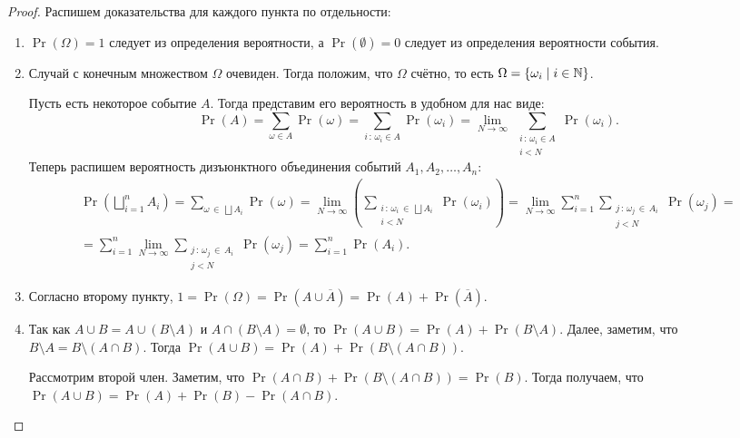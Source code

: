 \begin{proof}
    Распишем доказательства для каждого пункта по отдельности:
    \begin{enumerate}
        \item \(\Pr(\Omega) = 1\) следует из определения вероятности, а \(\Pr(\emptyset) = 0\) следует из определения вероятности события.
        
        \item Случай с конечным множеством \(\Omega\) очевиден. Тогда положим, что \(\Omega\) счётно, то есть \(\Omega = \left\{\omega_i \mid i \in \mathbb{N} \right\}\).
        
        Пусть есть некоторое событие \(A\). Тогда представим его вероятность в удобном для нас виде:
        \[\Pr(A) = \sum_{\omega \in A} \Pr(\omega) = \sum_{i\,:\,\omega_i \in A} \Pr(\omega_i) = \lim_{N \to \infty}\ \sum_{\substack{i\,:\, \omega_i \in A\\i < N}} \Pr(\omega_i).\]
        Теперь распишем вероятность дизъюнктного объединения событий \(A_1, A_2, \ldots, A_n\):
        \begin{multline*}
        \Pr\left(\bigsqcup_{i = 1}^{n} A_i\right) = \sum_{\omega\,\in\,\bigsqcup A_i} \Pr(\omega) = \lim_{N \to \infty} \left(\sum_{\substack{i\,:\,\omega_i\,\in\,\bigsqcup A_i\\i < N}} \Pr(\omega_i)\right) = \lim_{N \to \infty} \sum_{i = 1}^{n} \sum_{\substack{j\,:\,\omega_j\,\in\,A_i\\j < N}} \Pr(\omega_j) = \\ = \sum_{i = 1}^{n} \lim_{N \to \infty} \sum_{\substack{j\,:\,\omega_j\,\in\,A_i\\j < N}} \Pr(\omega_j) = \sum_{i = 1}^{n} \Pr(A_i).
        \end{multline*}
        
        \item Согласно второму пункту, \(1 = \Pr(\Omega) = \Pr(A \cup \overline{A}) = \Pr(A) + \Pr(\overline{A})\).
        
        \item Так как \(A \cup B = A \cup (B \setminus A)\) и \(A \cap (B \setminus A) = \emptyset\), то \(\Pr(A \cup B) = \Pr(A) + \Pr(B \setminus A)\). Далее, заметим, что \(B \setminus A = B \setminus (A \cap B)\). Тогда \(\Pr(A \cup B) = \Pr(A) + \Pr(B \setminus (A \cap B))\).
        
        Рассмотрим второй член. Заметим, что \(\Pr(A \cap B) + \Pr(B \setminus (A \cap B)) = \Pr(B)\).
        Тогда получаем, что \(\Pr(A \cup B) = \Pr(A) + \Pr(B) - \Pr(A \cap B)\).
        

\end{enumerate}
\end{proof}

